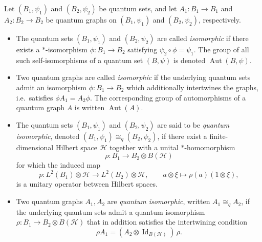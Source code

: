 \begin{definition}
    \label{def:quantum-isomorphisms}
    Let \( (B_{1}, \psi_{1}) \) and \( (B_{2}, \psi_{2}) \) be
    quantum sets, and let \( A_{1}\colon B_{1} \rightarrow B_{1} \)
    and \( A_{2}\colon B_{2} \rightarrow B_{2} \) be quantum graphs on
    \( (B_{1}, \psi_{1}) \) and \( (B_{2}, \psi_{2}) \), respectively.
    \begin{itemize}
        \item The quantum sets \( (B_1,\psi_1) \) and
            \( (B_2,\psi_2) \) are called \emph{isomorphic} if there
            exists a \( * \)-isomorphism \( \phi\colon B_{1}
            \rightarrow B_{2} \)
            satisfying \( \psi_{2} \circ \phi = \psi_{1} \). The group
            of all such self-isomorphisms of a quantum set
            \( (B, \psi) \) is denoted \( \operatorname{Aut}(B, \psi) \).
        \item Two quantum graphs are called \emph{isomorphic} if the
            underlying quantum sets admit an isomorphism
            \( \phi\colon B_{1} \rightarrow B_{2} \) which additionally
            intertwines the graphs, i.e.\ satisfies
            \( \phi A_{1} = A_{2} \phi \). The corresponding group of
            automorphisms of a quantum graph \( A \) is written
            \( \operatorname{Aut}(A) \).
        \item The quantum sets \( (B_1,\psi_1) \) and
            \( (B_2,\psi_2) \) are said to be \emph{quantum isomorphic},
            denoted \( (B_{1}, \psi_{1}) \cong_q (B_{2}, \psi_{2}) \),
            if there exist a finite-dimensional Hilbert space
            \( \mathcal{H} \) together with a unital
            \( * \)-homomorphism
            \[
                \rho\colon B_{1} \rightarrow B_{2} \otimes B(\mathcal{H})
            \]
            for which the induced map
            \[
                p\colon L^{2}(B_{1}) \otimes \mathcal{H} \rightarrow
                L^{2}(B_{2}) \otimes \mathcal{H}, \qquad
                a \otimes \xi \longmapsto \rho(a)(1 \otimes \xi),
            \]
            is a unitary operator between Hilbert spaces.
        \item Two quantum graphs \( A_1, A_2 \) are \emph{quantum
            isomorphic}, written \( A_{1} \cong_{q} A_{2} \), if the
            underlying quantum sets admit a quantum isomorphism
            \( \rho\colon B_{1} \rightarrow B_{2} \otimes B(\mathcal{H}) \)
            that in addition satisfies the intertwining condition
            \[
                \rho A_{1} = (A_{2} \otimes
                \operatorname{Id}_{B(\mathcal{H})}) \, \rho.
            \]
    \end{itemize}
\end{definition}

